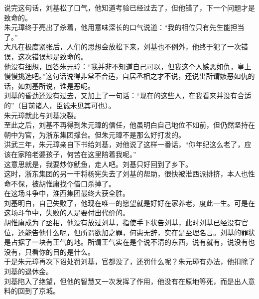 \begin{multicols}{\theparacolNo}
说完这句话，刘基松了口气，他知道考验已经过去了，但他错了，下一个问题才是致命的。\\

朱元璋终于亮出了杀着，他用意味深长的口气说道：“我的相位只有先生能担当了。”\\

大凡在极度紧张后，人们的思想会放松下来，刘基也不例外，他终于犯了一次错误，这次错误却是致命的。\\

他没有细想，回答朱元璋：“我并非不知道自己可以，但我这个人嫉恶如仇，皇上慢慢挑选吧。”这句话说得非常不合适，自居丞相之才不说，还说出所谓嫉恶如仇的话，如刘基所说，谁是恶呢。\\

刘基的昏劲还没有过去，又加上了一句话：“现在的这些人，在我看来并没有合适的”（目前诸人，臣诚未见其可也）。\\

朱元璋就此与刘基决裂。\\

至此之后，刘基不再得到朱元璋的信任，他虽明白自己地位不如前，但仍然坚持在朝中为官，为浙东集团撑台。但朱元璋不是那么好打发的。\\

洪武三年，朱元璋亲自下书给刘基，对他说了这样一番话，“你年纪这么老了，应该在家陪老婆孩子，何苦在这里陪着我呢。”\\

这意思就是，我要炒你鱿鱼，走人吧。刘基只好回到了乡下。\\

这时，浙东集团的另一干将杨宪失去了刘基的帮助，很快被淮西派排挤，本人也性命不保，被胡惟庸找个借口杀掉了。\\

在这场斗争中，淮西集团最终大获全胜。\\

刘基明白，自己失败了，他现在唯一的愿望就是好好在家养老，度此一生。可是在这场斗争中，失败的人是要付出代价的。\\

胡惟庸成为了丞相，他没有放过刘基，指使手下状告刘基，此时刘基已经没有官位，还能告他什么呢，但所谓欲加之罪，何患无辞，实在是至理名言。刘基的罪状是占据了一块有王气的地。所谓王气实在是个说不清的东西，说有就有，说没有也没有，只看你的目的是什么。\\

于是朱元璋再次下诏处罚刘基，官都没了，还罚什么呢？朱元璋有办法，他扣除了刘基的退休金。\\

刘基陷入了绝望，但他的智慧又一次发挥了作用，他没有在原地等死，而是出人意料的回到了京城。\\


\end{multicols}
